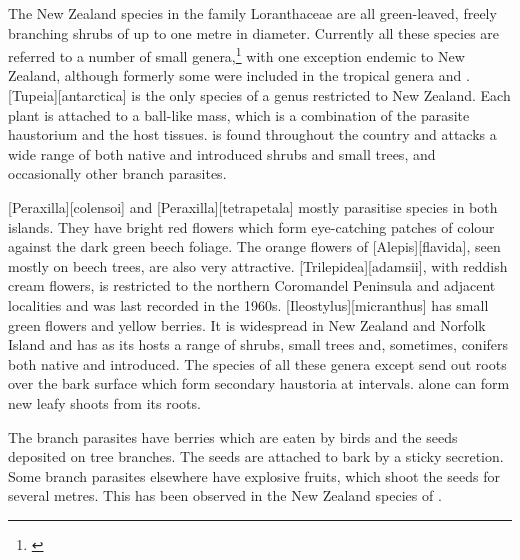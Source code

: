 The New Zealand species in the family Loranthaceae are all green-leaved, freely branching shrubs of up to one metre in diameter.
Currently all these species are referred to a number of small genera,\footnote{\cite{barlow1966revision}} with one exception endemic to New Zealand, although formerly some were included in the tropical genera  and .  [Tupeia][antarctica] is the only species of a genus restricted to New Zealand.
Each plant is attached to a ball-like mass, which is a combination of the parasite haustorium and the host tissues.  is found throughout the country and attacks a wide range of both native and introduced shrubs and small trees, and occasionally other branch parasites.

[Peraxilla][colensoi] and [Peraxilla][tetrapetala] mostly parasitise  species in both islands.
They have bright red flowers which form eye-catching patches of colour against the dark green beech foliage.
The orange flowers of [Alepis][flavida], seen mostly on beech trees, are also very attractive. [Trilepidea][adamsii], with reddish cream flowers, is restricted to the northern Coromandel Peninsula and adjacent localities and was last recorded in the 1960s. [Ileostylus][micranthus] has small green flowers and yellow berries.
It is widespread in New Zealand and Norfolk Island and has as its hosts a range of shrubs, small trees and, sometimes, conifers both native and introduced.
The species of all these genera except  send out roots over the bark surface which form secondary haustoria at intervals.  alone can form new leafy shoots from its roots.

The branch parasites have berries which are eaten by birds and the seeds deposited on tree branches.
The seeds are attached to bark by a sticky secretion.
Some branch parasites elsewhere have explosive fruits, which shoot the seeds for several metres.
This has been observed in the New Zealand species of .

